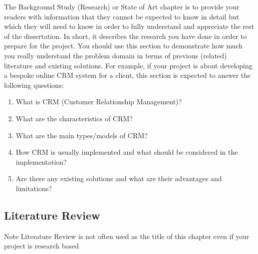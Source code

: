 	The Background Study (Research) or State of Art chapter is to provide your readers with information that they cannot be expected to know in detail but which they will need to know in order to fully understand and appreciate the rest of the dissertation. In short, it describes the research you have done in order to prepare for the project. You should use this section to demonstrate how much you really understand the problem domain in terms of previous (related) literature and existing solutions. For example, if your project is about developing a bespoke online CRM system for a client, this section is expected to answer the following questions:
	\begin{enumerate}
		\item What is CRM (Customer Relationship Management)?
		\item What are the characteristics of CRM?
		\item What are the main types/models of CRM?
		\item How CRM is usually implemented and what should be considered in the implementation?
		\item Are there any existing solutions and what are their advantages and limitations?
	\end{enumerate}

	\subsection{Literature Review}
	Note Literature Review is not often used as the title of this chapter even if your project is research based
\fi